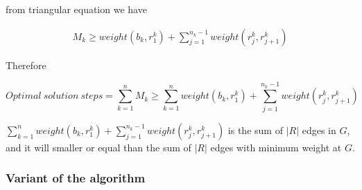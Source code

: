 \documentclass[a4paper, 12pt]{article}  %
\begin{document}
from triangular equation we have

\begin{align*}
    M_k \ge weight(b_k, r^k_1) + \sum_{j=1}^{n_k-1} weight(r^k_j,r^k_{j+1})
\end{align*}

Therefore

\begin{equation*}
    Optimal\ solution\ steps = \sum_{k=1}^n M_k \ge \sum_{k=1}^n weight(b_k, r^k_1) + \sum_{j=1}^{n_k-1} weight(r^k_j,r^k_{j+1})
\end{equation*}

$\sum_{k=1}^n weight(b_k, r^k_1) + \sum_{j=1}^{n_k-1} weight(r^k_j,r^k_{j+1})$ 
is the sum of $|R|$ edges in $G$, and it will smaller or equal than the sum of $|R|$ edges
with minimum weight at $G$.

\subsubsection{Variant of the algorithm}
\end{document}
